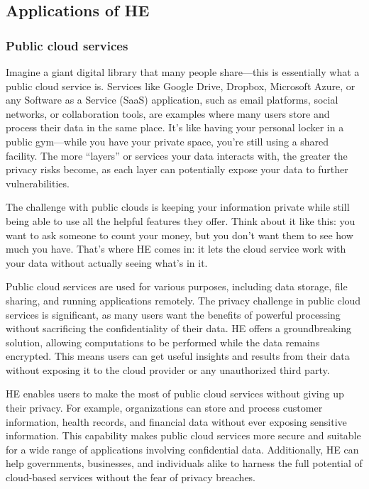 \documentclass[
  letterpaper,
  DIV=11,
  numbers=noendperiod,
  oneside]{scrartcl}
\begin{document}
\subsection{Applications of HE}\label{applications-of-he}

\subsubsection{Public cloud services}\label{public-cloud-services}

Imagine a giant digital library that many people share---this is
essentially what a public cloud service is. Services like Google Drive,
Dropbox, Microsoft Azure, or any Software as a Service (SaaS)
application, such as email platforms, social networks, or collaboration
tools, are examples where many users store and process their data in the
same place. It's like having your personal locker in a public
gym---while you have your private space, you're still using a shared
facility. The more ``layers'' or services your data interacts with, the
greater the privacy risks become, as each layer can potentially expose
your data to further vulnerabilities.

The challenge with public clouds is keeping your information private
while still being able to use all the helpful features they offer. Think
about it like this: you want to ask someone to count your money, but you
don't want them to see how much you have. That's where HE comes in: it
lets the cloud service work with your data without actually seeing
what's in it.

Public cloud services are used for various purposes, including data
storage, file sharing, and running applications remotely. The privacy
challenge in public cloud services is significant, as many users want
the benefits of powerful processing without sacrificing the
confidentiality of their data. HE offers a groundbreaking solution,
allowing computations to be performed while the data remains encrypted.
This means users can get useful insights and results from their data
without exposing it to the cloud provider or any unauthorized third
party.

HE enables users to make the most of public cloud services without
giving up their privacy. For example, organizations can store and
process customer information, health records, and financial data without
ever exposing sensitive information. This capability makes public cloud
services more secure and suitable for a wide range of applications
involving confidential data. Additionally, HE can help governments,
businesses, and individuals alike to harness the full potential of
cloud-based services without the fear of privacy breaches.
\end{document}
